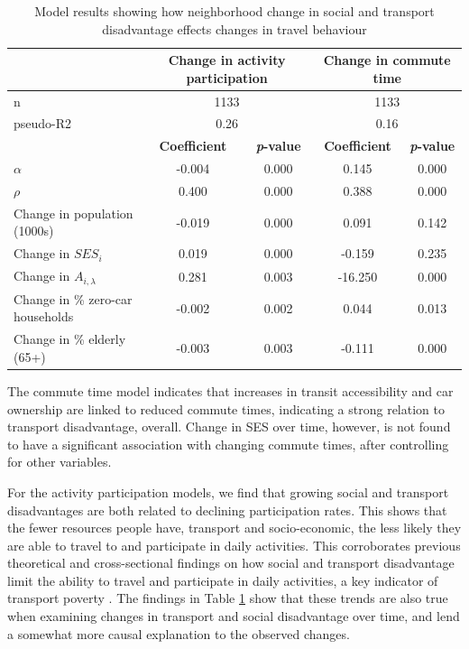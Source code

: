 \begin{table}[H]
	\small
	\centering
	\caption{{Model results showing how neighborhood change in social and transport disadvantage effects changes in travel behaviour}}
	\label{table:model}
	\begin{tabular}{lcccc}
		\hline
		& \multicolumn{2}{c}{\textbf{Change in activity participation}} & \multicolumn{2}{c}{\textbf{Change in commute time}} \\
		\hline
		n                & \multicolumn{2}{c}{1133}      & \multicolumn{2}{c}{1133}       \\
		pseudo-R2               & \multicolumn{2}{c}{0.26}      & \multicolumn{2}{c}{0.16}       \\
		\hline
		& \textbf{Coefficient}      & \textbf{\textit{p}-value}         & \textbf{Coefficient}     & \textbf{\textit{p}-value}         \\
		\hline
		$\alpha$ & -0.004           & 0.000     & 0.145           & 0.000     \\
		$\rho$      & 0.400            & 0.000     & 0.388           & 0.000     \\
		Change in population (1000s)      & -0.019           & 0.000     & 0.091           & 0.142     \\
		Change in $SES_i$      & 0.019            & 0.000     & -0.159          & 0.235     \\
		Change in $A_{i,\lambda}$       & 0.281            & 0.003     & -16.250         & 0.000     \\
		Change in \% zero-car households   & -0.002           & 0.002     & 0.044           & 0.013     \\
		Change in \% elderly (65+)  & -0.003           & 0.003     & -0.111         & 0.000    \\
		\hline
	\end{tabular}
\end{table}

The commute time model indicates that increases in transit accessibility and car ownership are linked to reduced commute times, indicating a strong relation to transport disadvantage, overall. Change in SES over time, however, is not found to have a significant association with changing commute times, after controlling for other variables. 


For the activity participation models, we find that growing social and transport disadvantages are both related to declining participation rates. This shows that the fewer resources people have, transport and socio-economic, the less likely they are able to travel to and participate in daily activities. This corroborates previous theoretical and cross-sectional findings on how social and transport disadvantage limit the ability to travel and participate in daily activities, a key indicator of transport poverty \cite{roorda_trip_2010,lucas_transport_2012,lucas_is_2018,allen_planning_2020}. The findings in Table \ref{table:model} show that these trends are also true when examining changes in transport and social disadvantage over time, and lend a somewhat more causal explanation to the observed changes.




